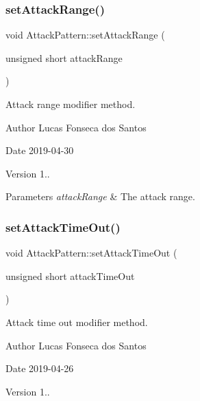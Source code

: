 \subsubsection{\texorpdfstring{set\+Attack\+Range()}{setAttackRange()}}
{\footnotesize\ttfamily void Attack\+Pattern\+::set\+Attack\+Range (\begin{DoxyParamCaption}\item[{unsigned short}]{attack\+Range }\end{DoxyParamCaption})}

Attack range modifier method. \begin{DoxyAuthor}{Author}
Lucas Fonseca dos Santos 
\end{DoxyAuthor}
\begin{DoxyDate}{Date}
2019-\/04-\/30 
\end{DoxyDate}
\begin{DoxyVersion}{Version}
1..
\end{DoxyVersion}

\begin{DoxyParams}{Parameters}
{\em attack\+Range} & The attack range. \\
\hline
\end{DoxyParams}
\mbox{\label{classAttackPattern_a3d00dd5e76516f44f55ea28464eab3f8}} 
\subsubsection{\texorpdfstring{set\+Attack\+Time\+Out()}{setAttackTimeOut()}}
{\footnotesize\ttfamily void Attack\+Pattern\+::set\+Attack\+Time\+Out (\begin{DoxyParamCaption}\item[{unsigned short}]{attack\+Time\+Out }\end{DoxyParamCaption})}

Attack time out modifier method. \begin{DoxyAuthor}{Author}
Lucas Fonseca dos Santos 
\end{DoxyAuthor}
\begin{DoxyDate}{Date}
2019-\/04-\/26 
\end{DoxyDate}
\begin{DoxyVersion}{Version}
1..
\end{DoxyVersion}

